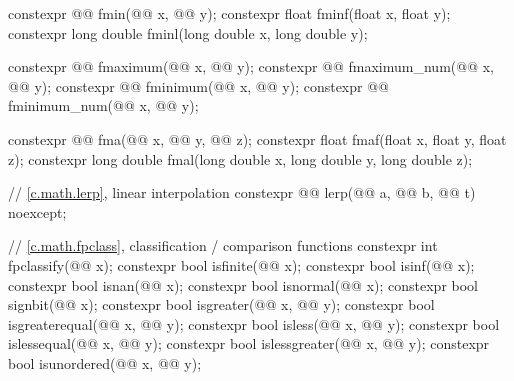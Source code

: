 \begin{codeblock}
{  constexpr @@ fmin(@@ x, @@ y);
  constexpr float               fminf(float x, float y);
  constexpr long double         fminl(long double x, long double y);

  constexpr @@ fmaximum(@@ x, @@ y);
  constexpr @@ fmaximum_num(@@ x, @@ y);
  constexpr @@ fminimum(@@ x, @@ y);
  constexpr @@ fminimum_num(@@ x, @@ y);

  constexpr @@ fma(@@ x, @@ y,
                                    @@ z);
  constexpr float               fmaf(float x, float y, float z);
  constexpr long double         fmal(long double x, long double y, long double z);

  // \ref{c.math.lerp}, linear interpolation
  constexpr @@ lerp(@@ a, @@ b,
                                     @@ t) noexcept;

  // \ref{c.math.fpclass}, classification / comparison functions
  constexpr int fpclassify(@@ x);
  constexpr bool isfinite(@@ x);
  constexpr bool isinf(@@ x);
  constexpr bool isnan(@@ x);
  constexpr bool isnormal(@@ x);
  constexpr bool signbit(@@ x);
  constexpr bool isgreater(@@ x, @@ y);
  constexpr bool isgreaterequal(@@ x, @@ y);
  constexpr bool isless(@@ x, @@ y);
  constexpr bool islessequal(@@ x, @@ y);
  constexpr bool islessgreater(@@ x, @@ y);
  constexpr bool isunordered(@@ x, @@ y);

}
\end{codeblock}
